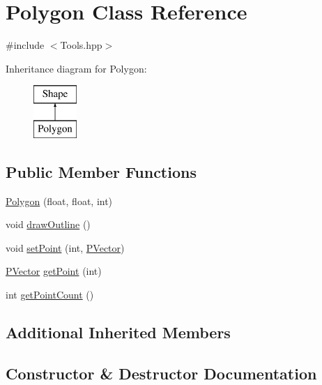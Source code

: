 \hypertarget{class_polygon}{}\section{Polygon Class Reference}
\label{class_polygon}


{\ttfamily \#include $<$Tools.\+hpp$>$}

Inheritance diagram for Polygon\+:\begin{figure}[H]
\begin{center}
\leavevmode
\includegraphics[height=2.000000cm]{class_polygon}
\end{center}
\end{figure}
\subsection*{Public Member Functions}
\begin{DoxyCompactItemize}
\item 
\hyperlink{class_polygon_a8ba4cc1def2c799bb4e75df1aa6fbb72}{Polygon} (float, float, int)
\item 
void \hyperlink{class_polygon_a3ae4366cd72f2414f133fab680983ea9}{draw\+Outline} ()
\item 
void \hyperlink{class_polygon_a55580fc352e83e29d3bc2679e5d8bdbf}{set\+Point} (int, \hyperlink{struct_p_vector}{P\+Vector})
\item 
\hyperlink{struct_p_vector}{P\+Vector} \hyperlink{class_polygon_a5423331a39f62cf1382b9465bfa170aa}{get\+Point} (int)
\item 
int \hyperlink{class_polygon_ad269b9c3f239834cd24235c73dd31bab}{get\+Point\+Count} ()
\end{DoxyCompactItemize}
\subsection*{Additional Inherited Members}


\subsection{Constructor \& Destructor Documentation}
\hypertarget{class_polygon_a8ba4cc1def2c799bb4e75df1aa6fbb72}{}\label{class_polygon_a8ba4cc1def2c799bb4e75df1aa6fbb72} 
